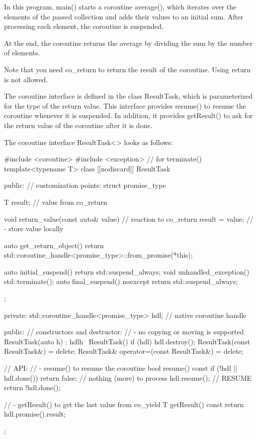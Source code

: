 In this program, main() starts a coroutine average(), which iterates over the elements of the passed collection and adds their values to an initial sum. After processing each element, the coroutine is suspended.

At the end, the coroutine returns the average by dividing the sum by the number of elements.

Note that you need co\_return to return the result of the coroutine. Using return is not allowed.

The coroutine interface is defined in the class ResultTask, which is parameterized for the type of the return value. This interface provides resume() to resume the coroutine whenever it is suspended. In addition, it provides getResult() to ask for the return value of the coroutine after it is done.

The coroutine interface ResultTask<> looks as follows:


\begin{cpp}
#include <coroutine>
#include <exception> // for terminate()
template<typename T>
class [[nodiscard]] ResultTask {
public:
	// customization points:
	struct promise_type {
		T result{}; // value from co_return
		
		void return_value(const auto& value) { // reaction to co_return
			result = value; // - store value locally
		}
		
		auto get_return_object() {
			return std::coroutine_handle<promise_type>::from_promise(*this);
		}
		
		auto initial_suspend() { return std::suspend_always{}; }
		void unhandled_exception() { std::terminate(); }
		auto final_suspend() noexcept { return std::suspend_always{}; }
	};
	
private:
	std::coroutine_handle<promise_type> hdl; // native coroutine handle
	
public:
	// constructors and destructor:
	// - no copying or moving is supported
	ResultTask(auto h) : hdl{h} { }
	~ResultTask() { if (hdl) hdl.destroy(); }
	ResultTask(const ResultTask&) = delete;
	ResultTask& operator=(const ResultTask&) = delete;
	
	// API:
	// - resume() to resume the coroutine
	bool resume() const {
		if (!hdl || hdl.done()) {
			return false; // nothing (more) to process
		}
		hdl.resume(); // RESUME
		return !hdl.done();
	}
	
	// - getResult() to get the last value from co_yield
	T getResult() const {
		return hdl.promise().result;
	}
};
\end{cpp}

